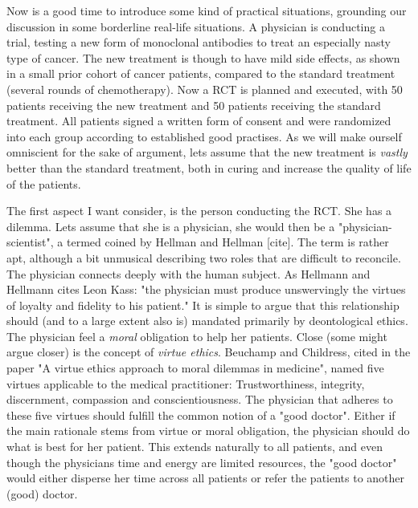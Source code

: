 \documentclass[12p]{article}
\begin{document}
Now is a good time to introduce some kind of practical situations, grounding our discussion in some borderline real-life situations.
A physician is conducting a trial, testing a new form of monoclonal antibodies to treat an especially nasty type of cancer.
The new treatment is though to have mild side effects, as shown in a small prior cohort of cancer patients, compared to the standard treatment (several rounds of chemotherapy).
Now a RCT is planned and executed, with 50 patients receiving the new treatment and 50 patients receiving the standard treatment.
All patients signed a written form of consent and were randomized into each group according to established good practises.
As we will make ourself omniscient for the sake of argument, lets assume that the new treatment is \emph{vastly} better than the standard treatment, both in curing and increase the quality of life of the patients.




The first aspect I want consider, is the person conducting the RCT.
She has a dilemma.
Lets assume that she is a physician, she would then be a "physician-scientist", a termed coined by Hellman and Hellman [cite].
The term is rather apt, although a bit unmusical describing two roles that are difficult to reconcile.
The physician connects deeply with the human subject.
As Hellmann and Hellmann cites Leon Kass: "the physician must produce unswervingly the virtues of loyalty and fidelity to his patient."
It is simple to argue that this relationship should (and to a large extent also is) mandated primarily by deontological ethics.
The physician feel a \emph{moral} obligation to help her patients.
Close (some might argue closer) is the concept of \emph{virtue ethics}.
Beuchamp and Childress, cited in the paper "A virtue ethics approach to moral dilemmas in medicine", named five virtues applicable to the medical practitioner:
Trustworthiness, integrity, discernment, compassion and conscientiousness.
The physician that adheres to these five virtues should fulfill the common notion of a "good doctor".
Either if the main rationale stems from virtue or moral obligation, the physician should do what is best for her patient.
This extends naturally to all patients, and even though the physicians time and energy are limited resources, the "good doctor" would either disperse her time across all patients or refer the patients to another (good) doctor.
\end{document}
